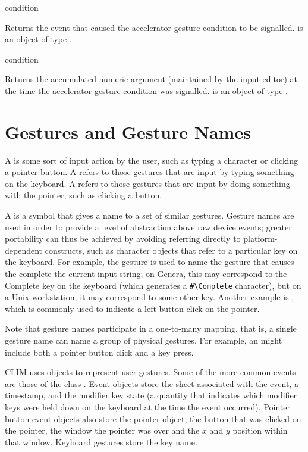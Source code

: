  {condition}

Returns the event that caused the accelerator gesture condition to be signalled.
 is an object of type .

 {condition}

Returns the accumulated numeric argument (maintained by the input editor) at the
time the accelerator gesture condition was signalled.   is an
object of type .


\section {Gestures and Gesture Names\label{gesture-names}}

A  is some sort of input action by the user, such as typing a
character or clicking a pointer button.  A  refers to
those gestures that are input by typing something on the keyboard.  A
 refers to those gestures that are input by doing
something with the pointer, such as clicking a button.

A  is a symbol that gives a name to a set of similar
gestures.  Gesture names are used in order to provide a level of abstraction
above raw device events; greater portability can thus be achieved by avoiding
referring directly to platform-dependent constructs, such as character objects
that refer to a particular key on the keyboard.  For example, the 
gesture is used to name the gesture that causes the  complete
the current input string; on Genera, this may correspond to the Complete key on
the keyboard (which generates a \verb+#\Complete+ character), but on a Unix
workstation, it may correspond to some other key.  Another example is
, which is commonly used to indicate a left button click on the
pointer.

Note that gesture names participate in a one-to-many mapping, that is, a single
gesture name can name a group of physical gestures.  For example, an 
might include both a pointer button click and a key press.

CLIM uses  objects to represent user gestures.  Some of the more
common events are those of the class .  Event objects
store the sheet associated with the event, a timestamp, and the modifier key
state (a quantity that indicates which modifier keys were held down on the
keyboard at the time the event occurred).  Pointer button event objects also
store the pointer object, the button that was clicked on the pointer, the window
the pointer was over and the $x$ and $y$ position within that window.  Keyboard
gestures store the key name.

